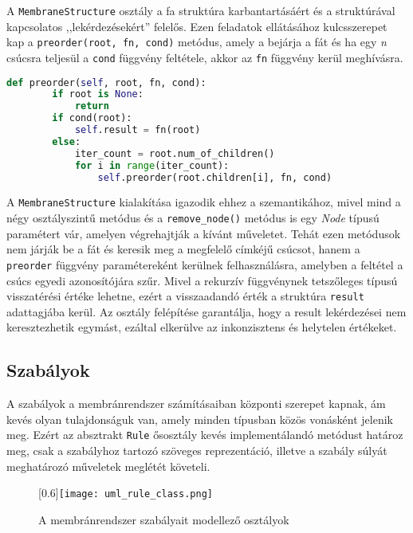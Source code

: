 A \verb|MembraneStructure| osztály a fa struktúra karbantartásáért és a struktúrával kapcsolatos ,,lekérdezésekért'' felelős. Ezen feladatok ellátásához kulcsszerepet kap a \verb|preorder(root, fn, cond)| metódus, amely a bejárja a fát és ha egy \textit{n} csúcsra teljesül a \verb|cond| függvény feltétele, akkor az  \verb|fn| függvény kerül meghívásra.

\begin{lstlisting}[language={Python}]
def preorder(self, root, fn, cond):
        if root is None:
            return
        if cond(root):
            self.result = fn(root)
        else:
            iter_count = root.num_of_children()
            for i in range(iter_count):
                self.preorder(root.children[i], fn, cond)
\end{lstlisting}

A \verb|MembraneStructure| kialakítása igazodik ehhez a szemantikához, mivel mind a négy osztályszintű metódus és a \verb|remove_node()| metódus is egy \textit{Node} típusú paramétert vár, amelyen végrehajtják a kívánt műveletet. Tehát ezen metódusok nem járják be a fát és keresik meg a megfelelő címkéjű csúcsot, hanem a \verb|preorder| függvény paramétereként kerülnek felhasználásra, amelyben a feltétel a csúcs egyedi azonosítójára szűr. Mivel a rekurzív függvénynek tetszőleges típusú visszatérési értéke lehetne, ezért a visszaadandó érték a struktúra \verb|result| adattagjába kerül. Az osztály felépítése garantálja, hogy a result lekérdezései nem keresztezhetik egymást, ezáltal elkerülve az inkonzisztens és helytelen értékeket.

\subsection{Szabályok}

A szabályok a membránrendszer számításaiban központi szerepet kapnak, ám kevés olyan tulajdonságuk van, amely minden típusban közös vonásként jelenik meg. Ezért az absztrakt \verb|Rule| ősosztály kevés implementálandó metódust határoz meg, csak a szabályhoz tartozó szöveges reprezentáció, illetve a szabály súlyát meghatározó műveletek meglétét követeli. 


\begin{figure}[H]
\centering
	\scalebox{0.6}[0.6]{\texttt{[image: uml\_rule\_class.png]}}
	\caption{A membránrendszer szabályait modellező osztályok}
	\label{fig:rule_uml}
\end{figure}

